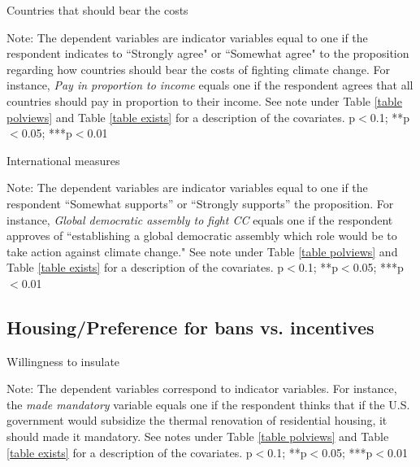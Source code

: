 \documentclass{article}
\begin{document}
\begin{landscape}
	\begin{table}[h!]
	\caption{Countries that should bear the costs}
	\begin{center}
		\scalebox{0.6}{}
	\end{center}
	{\footnotesize Note: The dependent variables are indicator variables equal to one if the respondent indicates to ``Strongly agree" or ``Somewhat agree" to the proposition regarding how countries should bear the costs of fighting climate change. For instance, \textit{Pay in proportion to income} equals one if the respondent agrees that all countries should pay in proportion to their income. See note under Table \ref{table polviews} and Table \ref{table exists} for a description of the covariates.
	\newline *p$<$0.1; **p$<$0.05; ***p$<$0.01}
\end{table}	
\end{landscape}

\begin{landscape}
	\begin{table}[h!]
	\caption{International measures}
	\begin{center}
		\scalebox{0.6}{}
	\end{center}
	{\footnotesize Note: The dependent variables are indicator variables equal to one if the respondent ``Somewhat supports'' or ``Strongly supports'' the proposition. For instance, \textit{Global democratic assembly to fight CC} equals one if the respondent approves of ``establishing a global democratic assembly which role would be to take action against climate change." See note under Table \ref{table polviews} and Table \ref{table exists} for a description of the covariates.
	\newline *p$<$0.1; **p$<$0.05; ***p$<$0.01}
\end{table}	
\end{landscape}



\clearpage
\subsection{Housing/Preference for bans vs. incentives}



\begin{table}[h!]
	\caption{Willingness to insulate}
	\begin{center}
		\scalebox{0.7}{}
	\end{center}
	{\footnotesize Note: The dependent variables correspond to indicator variables. For instance, the \textit{made mandatory} variable equals one if the respondent thinks that if the U.S. government would subsidize the thermal renovation of residential housing, it should made it mandatory. See notes under Table \ref{table polviews} and Table \ref{table exists} for a description of the covariates.
	\newline *p$<$0.1; **p$<$0.05; ***p$<$0.01}
\end{table}	
\end{document}
